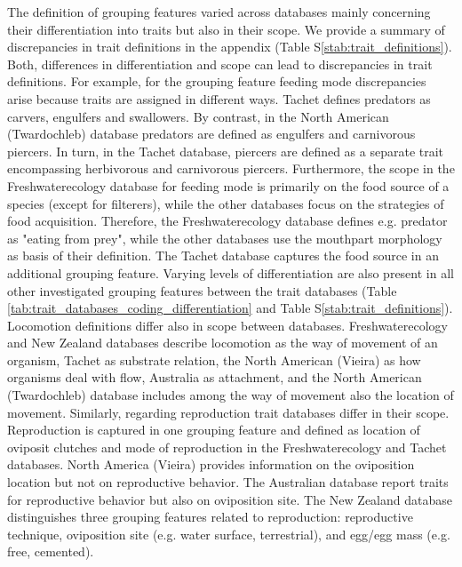 \documentclass[../Draft_harmonization_paper.tex]{subfiles}
\begin{document}
The definition of grouping features varied across databases mainly concerning their differentiation into traits but also in their scope. We provide a summary of discrepancies in trait definitions in the appendix (Table S\ref{stab:trait_definitions}). Both, differences in differentiation and scope can lead to discrepancies in trait definitions. For example, for the grouping feature feeding mode discrepancies arise because traits are assigned in different ways. Tachet defines predators as carvers, engulfers and swallowers. By contrast, in the North American (Twardochleb) database predators are defined as engulfers and carnivorous piercers. In turn, in the Tachet database, piercers are defined as a separate trait encompassing herbivorous and carnivorous piercers. Furthermore, the scope in the Freshwaterecology database for feeding mode is primarily on the food source of a species (except for filterers), while the other databases focus on the strategies of food acquisition. Therefore, the Freshwaterecology database defines e.g. predator as "eating from prey", while the other databases use the mouthpart morphology as basis of their definition. The Tachet database captures the food source in an additional grouping feature. Varying levels of differentiation are also present in all other investigated grouping features between the trait databases (Table \ref{tab:trait_databases_coding_differentiation} and Table S\ref{stab:trait_definitions}). Locomotion definitions differ also in scope between databases. Freshwaterecology and New Zealand databases describe locomotion as the way of movement of an organism, Tachet as substrate relation, the North American (Vieira) as how organisms deal with flow, Australia as attachment, and the North American (Twardochleb) database includes among the way of movement also the location of movement. Similarly, regarding reproduction trait databases differ in their scope. Reproduction is captured in one grouping feature and defined as location of oviposit clutches and mode of reproduction in the Freshwaterecology and Tachet databases. North America (Vieira) provides information on the oviposition location but not on reproductive behavior. The Australian database report traits for reproductive behavior but also on oviposition site. The New Zealand database distinguishes three grouping features related to reproduction: reproductive technique, oviposition site (e.g. water surface, terrestrial), and egg/egg mass (e.g. free, cemented).
\end{document}
